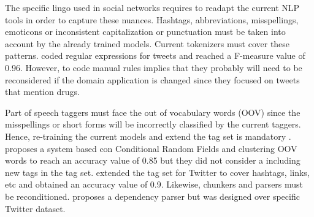 The specific lingo used in social networks requires to readapt the current NLP tools in order to capture these nuances. Hashtags, abbreviations, misspellings, emoticons or inconsistent capitalization or punctuation must be taken into account by the already trained models. Current tokenizers must cover these patterns. \citep{connotTokenizer} coded regular expressions for tweets and reached a F-measure value of 0.96. However, to code manual rules implies that they probably will need to be reconsidered if the domain application is changed since they focused on tweets that mention drugs.
\par Part of speech taggers must face the out of vocabulary words (OOV) since the misspellings or short forms will be incorrectly classified by the current taggers. Hence, re-training the current models and extend the tag set is mandatory \citep{synthesisLecturesSocial}. \citep{stanfordTwitterPosTagger} proposes a system based con Conditional Random Fields and clustering OOV words to reach an accuracy value of 0.85 but they did not consider a including new tags in the tag set. \citep{gimpelPosSetExtended} extended the tag set for Twitter to cover hashtags, links, etc and obtained an accuracy value of 0.9. Likewise, chunkers and parsers must be reconditioned. \cite{khanParserAdaptation} proposes a dependency parser but was designed over specific Twitter dataset.
	
		

